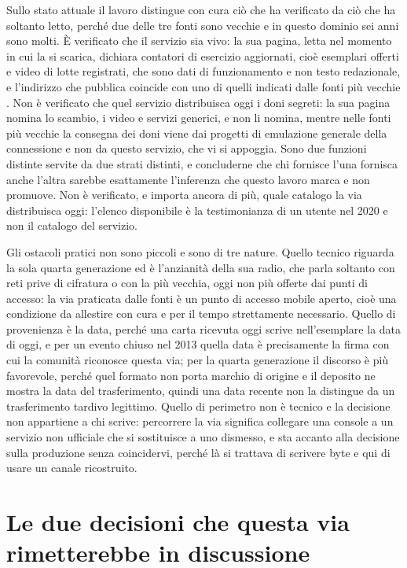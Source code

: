 Sullo stato attuale il lavoro distingue con cura ciò che ha verificato da ciò che ha soltanto letto, perché due delle tre fonti sono vecchie e in questo dominio sei anni sono molti. È verificato che il servizio sia vivo: la sua pagina, letta nel momento in cui la si scarica, dichiara contatori di esercizio aggiornati, cioè esemplari offerti e video di lotte registrati, che sono dati di funzionamento e non testo redazionale, e l'indirizzo che pubblica coincide con uno di quelli indicati dalle fonti più vecchie \cite{pkmnclassic}. Non è verificato che quel servizio distribuisca oggi i doni segreti: la sua pagina nomina lo scambio, i video e servizi generici, e non li nomina, mentre nelle fonti più vecchie la consegna dei doni viene dai progetti di emulazione generale della connessione e non da questo servizio, che vi si appoggia. Sono due funzioni distinte servite da due strati distinti, e concluderne che chi fornisce l'una fornisca anche l'altra sarebbe esattamente l'inferenza che questo lavoro marca e non promuove. Non è verificato, e importa ancora di più, quale catalogo la via distribuisca oggi: l'elenco disponibile è la testimonianza di un utente nel 2020 e non il catalogo del servizio.

Gli ostacoli pratici non sono piccoli e sono di tre nature. Quello tecnico riguarda la sola quarta generazione ed è l'anzianità della sua radio, che parla soltanto con reti prive di cifratura o con la più vecchia, oggi non più offerte dai punti di accesso: la via praticata dalle fonti è un punto di accesso mobile aperto, cioè una condizione da allestire con cura e per il tempo strettamente necessario. Quello di provenienza è la data, perché una carta ricevuta oggi scrive nell'esemplare la data di oggi, e per un evento chiuso nel 2013 quella data è precisamente la firma con cui la comunità riconosce questa via; per la quarta generazione il discorso è più favorevole, perché quel formato non porta marchio di origine e il deposito ne mostra la data del trasferimento, quindi una data recente non la distingue da un trasferimento tardivo legittimo. Quello di perimetro non è tecnico e la decisione non appartiene a chi scrive: percorrere la via significa collegare una console a un servizio non ufficiale che si sostituisce a uno dismesso, e sta accanto alla decisione sulla produzione senza coincidervi, perché là si trattava di scrivere byte e qui di usare un canale ricostruito.

\section{Le due decisioni che questa via rimetterebbe in discussione}

